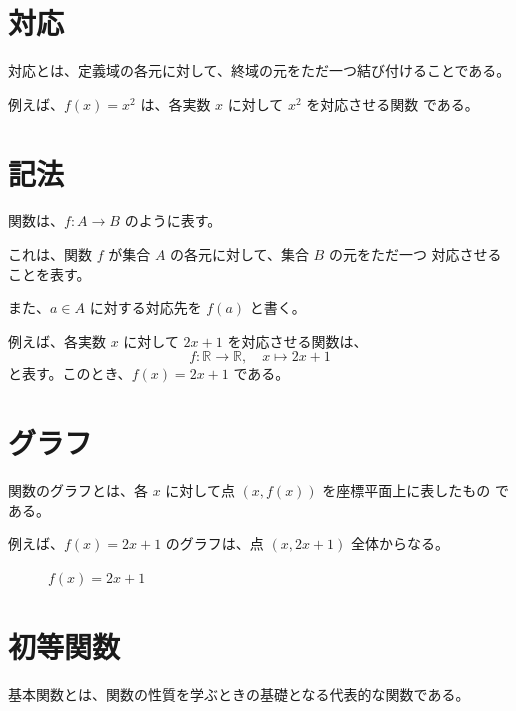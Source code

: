 \documentclass[11pt]{ltjsreport}
\begin{document}
\section{対応}

対応とは、定義域の各元に対して、終域の元をただ一つ結び付けることである。

例えば、\( f(x) = x^2 \) は、各実数 \( x \) に対して \( x^2 \) を対応させる関数
である。

\section{記法}

関数は、\( f : A \to B \) のように表す。

これは、関数 \( f \) が集合 \( A \) の各元に対して、集合 \( B \) の元をただ一つ
対応させることを表す。

また、\( a \in A \) に対する対応先を \( f(a) \) と書く。

例えば、各実数 \( x \) に対して \( 2x + 1 \) を対応させる関数は、
\[
   f : \mathbb{R} \to \mathbb{R}, \quad x \mapsto 2x + 1
\]
と表す。このとき、\( f(x) = 2x + 1 \) である。

\section{グラフ}

関数のグラフとは、各 \( x \) に対して点 \( (x, f(x)) \) を座標平面上に表したもの
である。

例えば、\( f(x) = 2x + 1 \) のグラフは、点 \( (x, 2x + 1) \) 全体からなる。

\begin{figure}[h]
   \centering
   \caption{\( f(x) = 2x + 1 \)}
\end{figure}

\section{初等関数}

基本関数とは、関数の性質を学ぶときの基礎となる代表的な関数である。
\end{document}
